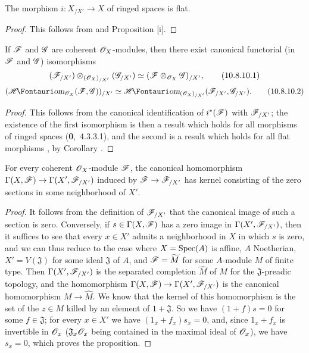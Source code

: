 \begin{corollary}[10.8.9]
\label{I.10.8.9}
The morphism $i:X_{/X'}\to X$ of ringed spaces is flat.
\end{corollary}

\begin{proof}
This follows from  and Proposition [i].
\end{proof}

\begin{corollary}[10.8.10]
\label{I.10.8.10}
If $\mathscr{F}$ and $\mathscr{G}$ are coherent $\mathscr{O}_X$-modules, then there exist canonical functorial (in $\mathscr{F}$ and $\mathscr{G}$) isomorphisms
\[
\label{I.10.8.10.1}
  (\mathscr{F}_{/X'})\otimes_{(\mathscr{O}_X)_{/X'}}(\mathscr{G}_{/X'})\simeq(\mathscr{F}\otimes_{\mathscr{O}_X}\mathscr{G})_{/X'},
  \tag{10.8.10.1}
\]
\[
\label{I.10.8.10.2}
  (\shHom_{\sh{O}_X}(\sh{F},\sh{G}))_{/X'}\isoto\shHom_{(\sh{O}_X)_{/X'}}(\sh{F}_{/X'},\sh{G}_{/X'}).
  \tag{10.8.10.2}
\]
\end{corollary}

\begin{proof}
This follows from the canonical identification of $i^*(\mathscr{F})$ with $\mathscr{F}_{/X'}$; the existence of the first isomorphism is then a result which holds for all morphisms of ringed spaces (\textbf{0},~4.3.3.1), and the second is a result which holds for all flat morphisms , by Corollary .
\end{proof}

\begin{proposition}[10.8.11]
\label{I.10.8.11}
For every coherent $\mathscr{O}_X$-module $\mathscr{F}$, the canonical homomorphism $\Gamma(X,\sh{F})\to\Gamma(X',\sh{F}_{/X'})$ induced by $\sh{F}\to\sh{F}_{/X'}$ has kernel consisting of the zero sections in some neighborhood of $X'$.
\end{proposition}

\begin{proof}
It follows from the definition of $\mathscr{F}_{/X'}$ that the canonical image of such a section is zero.
Conversely, if $s\in\Gamma(X,\mathscr{F})$ has a zero image in $\Gamma(X',\mathscr{F}_{/X'})$, then it suffices to see that every $x\in X'$ admits a neighborhood in $X$ in which $s$ is zero, and we can thus reduce to the case where $X=\operatorname{Spec}(A)$ is affine, $A$ Noetherian, $X'=V(\mathfrak{J})$ for some ideal $\mathfrak{J}$ of $A$, and $\mathscr{F}=\widetilde{M}$ for some $A$-module $M$ of finite type.
Then $\Gamma(X',\mathscr{F}_{/X'})$ is the separated completion $\widehat{M}$ of $M$ for the $\mathfrak{J}$-preadic topology, and the homomorphism $\Gamma(X,\sh{F})\to\Gamma(X',\sh{F}_{/X'})$ is the canonical homomorphism $M\to\widehat{M}$.
We know  that the kernel of this homomorphism is the set of the $z\in M$ killed by an element of $1+\mathfrak{J}$.
So we have $(1+f)s=0$ for some $f\in\mathfrak{J}$; for every $x\in X'$ we have $(1_x+f_x)s_x=0$, and, since $1_x+f_x$ is invertible in $\mathscr{O}_x$ ($\mathfrak{J}_x\mathscr{O}_x$ being contained in the maximal ideal of $\mathscr{O}_x$), we have $s_x=0$, which proves the proposition.
\end{proof}

